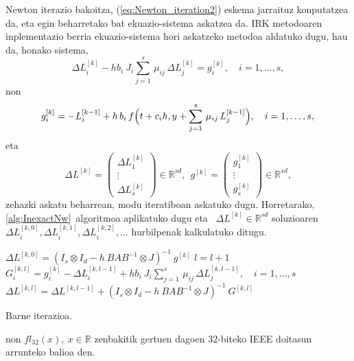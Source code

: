 Newton iterazio bakoitza, (\ref{eq:Newton_iteration2}) eskema jarraituz konputatzea da, eta egin beharretako bat ekuazio-sistema askatzea da. IRK metodoaren inplementazio berria ekuazio-sistema hori askatzeko metodoa aldatuko dugu, hau da, honako sistema,
\begin{equation}
\label{eq:linsysZ}
 \Delta L_{i}^{[k]}  - h b_i \ J_i \sum_{j=1}^{s}\, \mu_{ij} \, \Delta L_{j}^{[k]} = g_i^{[k]}, \quad  i=1 ,\ldots, s, 
\end{equation}
non
\begin{equation}
\label{eq:gk}
g_i^{[k]} = -L_{i}^{[k-1]}  + h \, b_i\, f\Big(t+c_i h,  y+\sum_{j=1}^{s}\, \mu_{ij}\, L_{j}^{[k-1]}\Big), \quad  i=1 ,\ldots, s, \\
\end{equation}
eta
\begin{equation*}
\Delta L^{[k]}= \left(
\begin{matrix}
\Delta L_1^{[k]}\\
\vdots\\
\Delta L_s^{[k]}
\end{matrix}
\right) \in \mathbb{R}^{sd}, \ \
g^{[k]}= \left(
\begin{matrix}
g_1^{[k]} \\
\vdots\\
g_s^{[k]}
\end{matrix}
\right) \in \mathbb{R}^{sd},
\end{equation*}
%
zehazki askatu beharrean, modu iteratiboan askatuko dugu. Horretarako,  \ref{alg:InexactNw}~algoritmoa aplikatuko dugu eta ~$\Delta L^{[k]} \in \mathbb{R}^{sd}$ soluzioaren  $ \Delta L_{i}^{[k,0]},  \Delta L_{i}^{[k,1]},  \Delta L_{i}^{[k,2]}, \ldots$ hurbilpenak kalkulatuko ditugu. 

\begin{algorithm}[H]
  $ \Delta L^{[k,0]} = (I_s \otimes I_d - h \ BAB^{-1} \otimes J)^{-1} \ g^{[k]}$\;
  \BlankLine
  {
   \BlankLine
   $l=l+1$\;
   $G_i^{[k,l]} = g_i^{[k]} - \Delta L_{i}^{[k,l-1]}  + h b_i \ J_i \sum_{j=1}^{s}\, \mu_{ij} \, \Delta L_{j}^{[k,l-1]},  \quad  i=1 ,\ldots, s$\;
   \BlankLine
   $\Delta L^{[k,l]}=\Delta L^{[k,l-1]}+ (I_s \otimes I_d - h \ BAB^{-1} \otimes J)^{-1} \ G^{[k,l]}$\;
  }
 \caption{Barne iterazioa.}
 \label{alg:InexactNw}
\end{algorithm}

non $fl_{32}(x), \ x \in \mathbb{R}$ zenbakitik gertuen dagoen $32$-biteko IEEE doitasun arrunteko balioa den.


